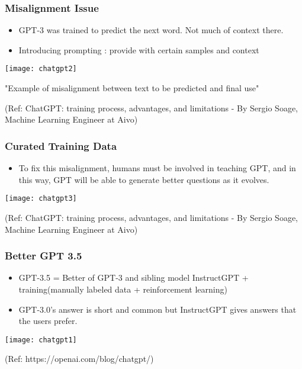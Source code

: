 \begin{frame}[fragile]\frametitle{Misalignment Issue}


\begin{itemize}
\item GPT-3 was trained to predict the next word. Not much of context there.
\item Introducing prompting : provide with certain samples and context

\end{itemize}	 

			\begin{center}
			\texttt{[image: chatgpt2]}
			
			{\tiny "Example of misalignment between text to be predicted and final use"}
			\end{center}		
			
			
			{\tiny (Ref: ChatGPT: training process, advantages, and limitations - By Sergio Soage, Machine Learning Engineer at Aivo)}
			
\end{frame}

\begin{frame}[fragile]\frametitle{Curated Training Data}


\begin{itemize}
\item To fix this misalignment, humans must be involved in teaching GPT, and in this way, GPT will be able to generate better questions as it evolves.
\end{itemize}	 

			\begin{center}
			\texttt{[image: chatgpt3]}
			
			\end{center}		
			
			{\tiny (Ref: ChatGPT: training process, advantages, and limitations - By Sergio Soage, Machine Learning Engineer at Aivo)}
			
\end{frame}


\begin{frame}[fragile]\frametitle{Better GPT 3.5}

\begin{itemize}
\item GPT-3.5 = Better of GPT-3 and sibling model InstructGPT + training(manually labeled data + reinforcement learning)
\item GPT-3.0’s answer is short and common but InstructGPT gives answers that the users prefer.
\end{itemize}	 
			\begin{center}
			\texttt{[image: chatgpt1]}
			\end{center}		
			
			\tiny{(Ref: https://openai.com/blog/chatgpt/)}
\end{frame}

